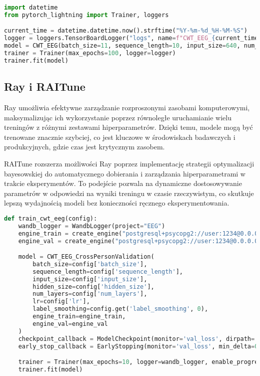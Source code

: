 \documentclass[12pt,twoside]{article}
\begin{document}
\begin{lstlisting}[language=Python, caption=Konfiguracja i uruchomienie trenera w PyTorch Lightning]
import datetime
from pytorch_lightning import Trainer, loggers

current_time = datetime.datetime.now().strftime("%Y-%m-%d_%H-%M-%S")
logger = loggers.TensorBoardLogger("logs", name=f"CWT_EEG_{current_time}")
model = CWT_EEG(batch_size=11, sequence_length=10, input_size=640, num_layers=3, hidden_size=100, lr=0.001).to(device)
trainer = Trainer(max_epochs=100, logger=logger)
trainer.fit(model)
\end{lstlisting}


\subsection{Ray i RAITune}
Ray umożliwia efektywne zarządzanie rozproszonymi zasobami komputerowymi, maksymalizując ich wykorzystanie poprzez równoległe uruchamianie wielu treningów z różnymi zestawami hiperparametrów. Dzięki temu, modele mogą być trenowane znacznie szybciej, co jest kluczowe w środowiskach badawczych i produkcyjnych, gdzie czas jest krytycznym zasobem.

RAITune rozszerza możliwości Ray poprzez implementację strategii optymalizacji bayesowskiej do automatycznego dobierania i zarządzania hiperparametrami w trakcie eksperymentów. To podejście pozwala na dynamiczne dostosowywanie parametrów w odpowiedzi na wyniki treningu w czasie rzeczywistym, co skutkuje lepszą wydajnością modeli bez konieczności ręcznego eksperymentowania.

\begin{lstlisting}[language=Python, caption=Integracja Ray i RAITune do efektywnego zarządzania i optymalizacji hiperparametrów]
def train_cwt_eeg(config):
    wandb_logger = WandbLogger(project="EEG")
    engine_train = create_engine("postgresql+psycopg2://user:1234@0.0.0.0:5433/dbtrain", echo=True, pool_size=10)
    engine_val = create_engine("postgresql+psycopg2://user:1234@0.0.0.0:5434/dbval", echo=True, pool_size=10)

    model = CWT_EEG_CrossPersonValidation(
        batch_size=config['batch_size'],
        sequence_length=config['sequence_length'],
        input_size=config['input_size'],
        hidden_size=config['hidden_size'],
        num_layers=config['num_layers'],
        lr=config['lr'],
        label_smoothing=config.get('label_smoothing', 0),
        engine_train=engine_train,
        engine_val=engine_val
    )
    checkpoint_callback = ModelCheckpoint(monitor='val_loss', dirpath='model_checkpoints', filename='model-{epoch:02d}-{val_loss:.2f}', save_top_k=3, mode='min')
    early_stop_callback = EarlyStopping(monitor='val_loss', min_delta=0.00, patience=3, verbose=True, mode='min')

    trainer = Trainer(max_epochs=10, logger=wandb_logger, enable_progress_bar=False, callbacks=[checkpoint_callback, early_stop_callback, TuneReportCallback({"loss": "ptl/val_loss"}, on="validation_end")])
    trainer.fit(model)
\end{lstlisting}
\end{document}
